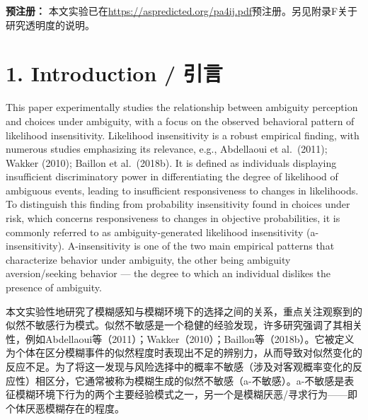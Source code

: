 \documentclass[12pt,a4paper]{article}
\newenvironment{original}
  {\par\medskip\noindent\color{black}\ignorespaces}
  {\par\medskip}
\newenvironment{translation}
  {\par\noindent\color{transblue}\ignorespaces}
  {\par\medskip\medskip}
\begin{document}
\begin{translation}
\textbf{预注册：} 本文实验已在\url{https://aspredicted.org/pa4ij.pdf}预注册。另见附录F关于研究透明度的说明。
\end{translation}

\newpage

\section{1. Introduction / 引言}

\begin{original}
This paper experimentally studies the relationship between ambiguity perception and choices under ambiguity, with a focus on the observed behavioral pattern of likelihood insensitivity. Likelihood insensitivity is a robust empirical finding, with numerous studies emphasizing its relevance, e.g., Abdellaoui et al.\ (2011); Wakker (2010); Baillon et al.\ (2018b). It is defined as individuals displaying insufficient discriminatory power in differentiating the degree of likelihood of ambiguous events, leading to insufficient responsiveness to changes in likelihoods. To distinguish this finding from probability insensitivity found in choices under risk, which concerns responsiveness to changes in objective probabilities, it is commonly referred to as ambiguity-generated likelihood insensitivity (a-insensitivity). A-insensitivity is one of the two main empirical patterns that characterize behavior under ambiguity, the other being ambiguity aversion/seeking behavior --- the degree to which an individual dislikes the presence of ambiguity.
\end{original}

\begin{translation}
本文实验性地研究了模糊感知与模糊环境下的选择之间的关系，重点关注观察到的似然不敏感行为模式。似然不敏感是一个稳健的经验发现，许多研究强调了其相关性，例如Abdellaoui等（2011）；Wakker（2010）；Baillon等（2018b）。它被定义为个体在区分模糊事件的似然程度时表现出不足的辨别力，从而导致对似然变化的反应不足。为了将这一发现与风险选择中的概率不敏感（涉及对客观概率变化的反应性）相区分，它通常被称为模糊生成的似然不敏感（a-不敏感）。a-不敏感是表征模糊环境下行为的两个主要经验模式之一，另一个是模糊厌恶/寻求行为——即个体厌恶模糊存在的程度。
\end{translation}
\end{document}
